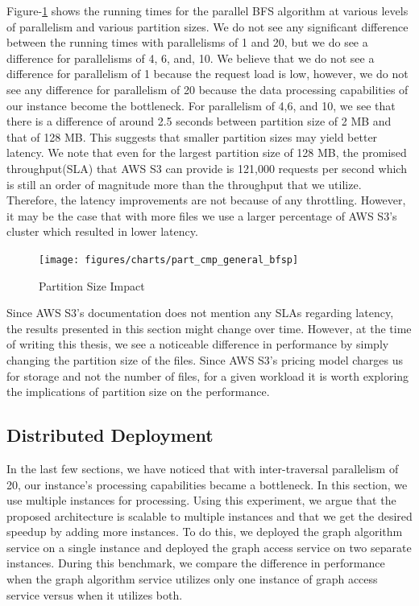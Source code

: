 \smallskip
Figure-\ref{fig:partitionSizeImp} shows the running times for the parallel BFS
algorithm at various levels of parallelism and various partition sizes. We do
not see any significant difference between the running times with parallelisms of
1 and 20, but we do see a difference for parallelisms of 4, 6, and, 10.
We believe that we do not see a difference for parallelism of 1 because the
request load is low, however, we do not see any difference for parallelism of 20
because the data processing capabilities of our instance become the bottleneck.
For parallelism of 4,6, and 10, we see that there is a difference of around 2.5
seconds between partition size of 2 MB and that of 128 MB. This suggests that
smaller partition sizes may yield better latency. We note that even for the
largest partition size of 128 MB, the promised throughput(SLA) that AWS S3 can
provide is
121,000 requests per second which is still an order of magnitude more than the
throughput that we utilize. Therefore, the latency improvements are not because
of any throttling. However, it may be the case that with more files we use
a larger percentage of AWS S3's cluster which resulted in lower
latency.
\begin{figure}[ht]
    \centering
    \texttt{[image: figures/charts/part\_cmp\_general\_bfsp]}
    \caption{Partition Size Impact}
    \label{fig:partitionSizeImp}
\end{figure}

\medskip
Since AWS S3's documentation does not mention any SLAs regarding latency,
the results presented in this section might change over time. However, at the time of
writing this thesis, we see a noticeable difference in performance by simply
changing the partition size of the files. Since AWS S3's pricing model charges
us for storage and not the number of files, for a given workload it is
worth exploring the implications of partition size on the performance.

\subsection{Distributed Deployment}\label{sec:distDeploy}
In the last few sections, we have noticed that with inter-traversal parallelism
of 20, our instance's processing capabilities became a bottleneck. In this
section, we use multiple instances for processing. Using this experiment, we
argue that the proposed architecture is scalable to multiple instances and that
we get the desired speedup by adding more instances. To do this, we
deployed the graph algorithm service on a single instance and deployed the graph access
service on two separate instances. During this benchmark, we compare the
difference in performance when the graph algorithm service utilizes only one
instance of graph access service versus when it utilizes both.

